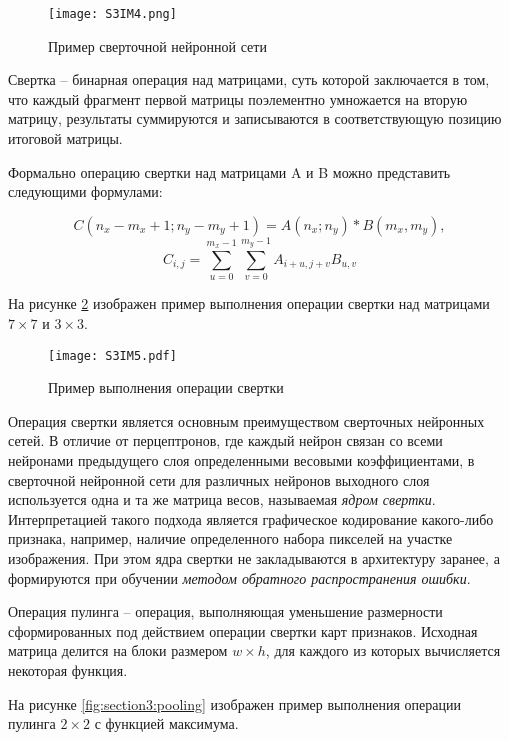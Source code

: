 \begin{figure}[h!]
    \centering
    \texttt{[image: S3IM4.png]}
    \caption{Пример сверточной нейронной сети}
    \label{fig:section3:simple_cnn}
\end{figure}

Свертка -- бинарная операция над матрицами, 
суть которой заключается в том, 
что каждый фрагмент первой матрицы поэлементно умножается на вторую матрицу, 
результаты суммируются и записываются 
в соответствующую позицию итоговой матрицы.

Формально операцию свертки над матрицами A и B можно представить следующими
формулами:

\begin{equation*}
    C(n_x - m_x + 1; n_y - m_y + 1) = A(n_x; n_y) * B(m_x, m_y),
\end{equation*}
%
\begin{equation*}
    \textstyle C_{i,j} = \sum_{u = 0}^{m_x - 1} \sum_{v = 0}^{m_y - 1} A_{i + u, j + v} B_{u, v}
\end{equation*} 

На рисунке \ref{fig:section3:convolution} изображен пример
выполнения операции свертки над матрицами 
$\textstyle 7 \times 7$ и $3 \times 3$.

\begin{figure}[h!]
    \centering
    \texttt{[image: S3IM5.pdf]}
    \caption{Пример выполнения операции свертки}
    \label{fig:section3:convolution}
\end{figure}

Операция свертки является основным преимуществом сверточных нейронных сетей.
В отличие от перцептронов, где каждый нейрон связан со всеми нейронами предыдущего
слоя определенными весовыми коэффициентами, в сверточной нейронной сети
для различных нейронов выходного слоя используется одна и та же матрица весов,
называемая \emph{ядром свертки}. Интерпретацией такого подхода является
графическое кодирование какого-либо признака, например, наличие определенного набора
пикселей на участке изображения. При этом ядра свертки не закладываются
в архитектуру заранее, а формируются при обучении 
\emph{методом обратного распространения ошибки}.  

Операция пулинга -- операция,
выполняющая уменьшение размерности сформированных под действием операции
свертки карт признаков. Исходная матрица делится на блоки размером 
$\textstyle w \times h$, 
для каждого из которых вычисляется некоторая функция.

На рисунке \ref{fig:section3:pooling} изображен пример выполнения 
операции пулинга $\textstyle 2 \times 2$ с функцией максимума.

